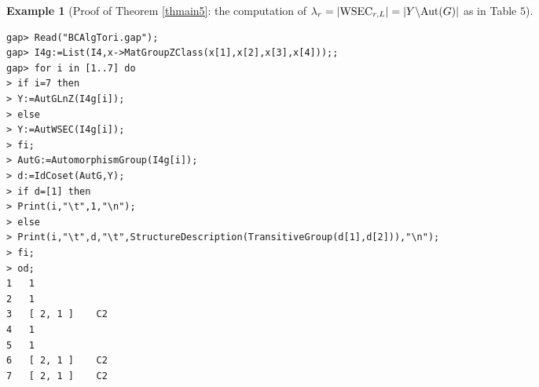 \documentclass{amsart}
\theoremstyle{plain}
\theoremstyle{definition}
\newtheorem{example}[theorem]{Example}
\theoremstyle{remark}
\begin{document}
\bigskip
\begin{example}[Proof of {Theorem \ref{thmain5}}: the computation of $\lambda_r=|{\rm WSEC}_{r,L}|=|Y\backslash {\rm Aut}(G)|$ as in Table $5$]\label{ex9.9}~\vspace*{-5mm}\\
\begin{verbatim}
gap> Read("BCAlgTori.gap");
gap> I4g:=List(I4,x->MatGroupZClass(x[1],x[2],x[3],x[4]));;
gap> for i in [1..7] do
> if i=7 then
> Y:=AutGLnZ(I4g[i]);
> else
> Y:=AutWSEC(I4g[i]);
> fi;
> AutG:=AutomorphismGroup(I4g[i]);
> d:=IdCoset(AutG,Y);
> if d=[1] then
> Print(i,"\t",1,"\n");
> else
> Print(i,"\t",d,"\t",StructureDescription(TransitiveGroup(d[1],d[2])),"\n");
> fi;
> od;
1	1
2	1
3	[ 2, 1 ]	C2
4	1
5	1
6	[ 2, 1 ]	C2
7	[ 2, 1 ]	C2
\end{verbatim}
\end{example}
\end{document}
